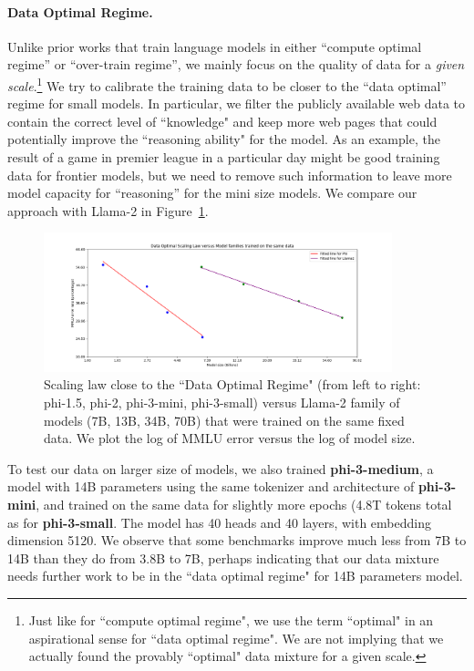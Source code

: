 \documentclass[11pt]{article}
\begin{document}
\paragraph{Data Optimal Regime.} Unlike prior works that train language models in either ``compute optimal regime'' \cite{hoffmann2022training} or ``over-train regime'', we mainly focus on the quality of data for a {\em given scale}.\footnote{Just like for ``compute optimal regime", we use the term ``optimal" in an aspirational sense for ``data optimal regime". We are not implying that we actually found the provably ``optimal" data mixture for a given scale.} We try to calibrate the training data to be closer to the ``data optimal'' regime for small models. In particular, we filter the publicly available web data to contain the correct level of ``knowledge" and keep more web pages that could potentially improve the ``reasoning ability" for the model. As an example, the result of a game in premier league in a particular day might be good training data for frontier models, but we need to remove such information to leave more model capacity for ``reasoning'' for the mini size models. We compare our approach with Llama-2 in Figure~\ref{fig:enter-label}.
\begin{figure}
    \centering
    \includegraphics[width=0.9\textwidth]{scaling.png}
    \caption{Scaling law close to the ``Data Optimal Regime" (from left to right: phi-1.5, phi-2, phi-3-mini, phi-3-small) versus Llama-2 family of models (7B, 13B, 34B, 70B) that were trained on the same fixed data. We plot the log of MMLU error versus the log of model size.}
    \label{fig:enter-label}
\end{figure}

To test our data on larger size of models, we also trained \textbf{phi-3-medium}, a model with 14B parameters using the  same tokenizer and architecture of \textbf{phi-3-mini}, and trained on the same data for slightly more epochs (4.8T tokens total as for \textbf{phi-3-small}. The model has 40 heads and 40 layers, with embedding dimension 5120. We observe that some benchmarks improve much less from 7B to 14B than they do from 3.8B to 7B, perhaps indicating that our data mixture needs further work to be in the ``data optimal regime" for 14B parameters model.
\end{document}
